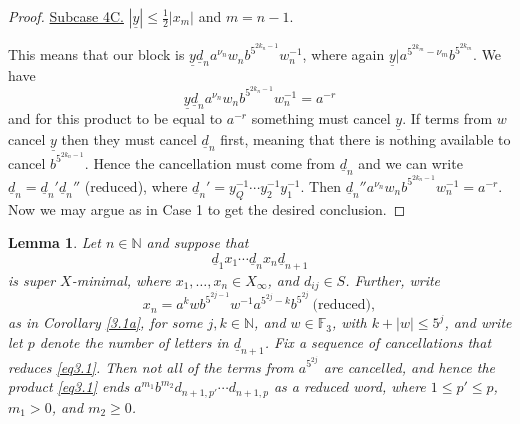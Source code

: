 \documentclass[twoside,11pt]{amsart}
\numberwithin{equation}{section}
\newtheorem{lemma}[theorem]{Lemma}
\theoremstyle{definition}
\newcommand {\N}{\mathbb N}
\newcommand{\1}{\mathbbm{1}}
\newcommand{\F}{\mathbb F}
\newcommand{\pdt}{\underline}
\begin{document}
\begin{proof}
		\vskip 2mm
		\noindent
		\underline{Subcase 4C.} $|\pdt{y}| \leq \frac{1}{2}|x_m|$  and $m=n-1$.
		
		This means that our block is $\pdt{y}\pdt{d}_n a^{\nu_n} w_n b^{5^{2k_n-1}} w_n^{-1}$, where again  $\pdt{y} | a^{5^{2k_m} - \nu_m} b^{5^{2k_m}}$. 
		We have 
		$$\pdt{y} \pdt{d}_n a^{\nu_n} w_n b^{5^{2k_n-1}} w_n^{-1} = a^{-r}$$
		and for this product to be equal to $a^{-r}$ something must cancel $\pdt{y}$. If terms from $w$ cancel $\pdt{y}$ then they must cancel $\pdt{d}_n$ first, meaning that there is nothing available to cancel $b^{5^{2k_n-1}}$. 
		Hence the cancellation must come from $\pdt{d}_n$ and we can write $\pdt{d}_n = \pdt{d}_n' \pdt{d}_n''$ (reduced), 
		where $\pdt{d}_n' = y_Q^{-1}\cdots y_2^{-1} y_1^{-1}$. Then  $\pdt{d}_n'' a^{\nu_n} w_n b^{5^{2k_n-1}} w_n^{-1} = a^{-r}$. Now we may argue as in Case 1 to get the desired conclusion.
	\end{proof}
	
	\begin{lemma}		\label{3.4}
		Let $n \in \N$ and suppose that 
		\begin{equation}		\label{eq3.1}
			\pdt{d}_1 x_1 \cdots \pdt{d}_n x_n \pdt{d}_{n+1}
		\end{equation}
		is super $X$-minimal, where $x_1, \ldots, x_n \in X_\infty$, and $d_{ij} \in S$. 
		Further, write 
		$$x_n = a^k w b^{5^{2j-1}} w^{-1} a^{5^{2j}-k}b^{5^{2j}} \ \text{(reduced)},$$
		 as in Corollary \ref{3.1a}, for some $j,k \in \N$, and $w \in \F_3$, with $k + |w| \leq 5^{j}$, and write let $p$ denote the number of letters in $\pdt{d}_{n+1}$. %
		  Fix a sequence of cancellations that reduces \eqref{eq3.1}. Then not all of the terms from $a^{5^{2j}}$ are cancelled, and hence the product \eqref{eq3.1} ends $a^{m_1} b^{m_2} d_{n+1, p'} \cdots d_{n+1, p}$ as a reduced word, where $1 \leq p' \leq p$, $m_1>0$, and $m_2 \geq 0$.
	\end{lemma}
	
\end{document}
